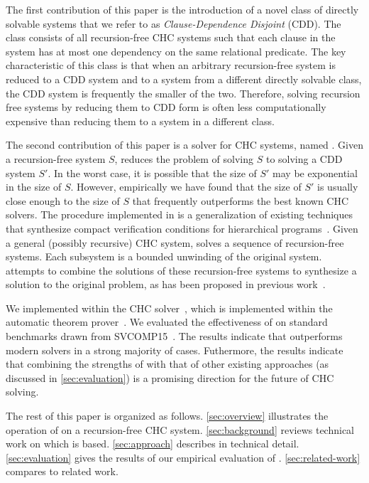 The first contribution of this paper is the introduction of a novel
class of directly solvable systems that we refer to as
\emph{Clause-Dependence Disjoint} (CDD).
%
The class consists of all recursion-free CHC systems such that each
clause in the system has at most one dependency on the same relational
predicate.
%
The key characteristic of this class is that when an arbitrary
recursion-free system is reduced to a CDD system and to a system from
a different directly solvable class, the CDD system is frequently the
smaller of the two.
%
Therefore, solving recursion free systems by reducing them to CDD form
is often less computationally expensive than reducing them to a
system in a different class.

The second contribution of this paper is a solver for CHC systems,
named \sys.
%
Given a recursion-free system $S$, \sys reduces the problem of solving
$S$ to solving a CDD system $S'$.
%
In the worst case, it is possible that the size of $S'$ may be
exponential in the size of $S$.
%
However, empirically we have found that the size of $S'$ is usually
close enough to the size of $S$ that \sys frequently outperforms the best
known CHC solvers.
%
The procedure implemented in \sys is a generalization of existing
techniques that synthesize compact verification conditions for
hierarchical programs~\cite{flanagan01,lal-qadeer15}.
%
Given a general (possibly recursive) CHC system, \sys solves a
sequence of recursion-free systems.
%
Each subsystem is a bounded unwinding of the original system. \sys
attempts to combine the solutions of these recursion-free systems to
synthesize a solution to the original problem, as has been proposed
in previous work~\cite{rummer13b}.

We implemented \sys within the \duality CHC solver~\cite{bjorner13},
which is implemented within the \zthree automatic theorem
prover~\cite{moura08}.
%
We evaluated the effectiveness of \sys on standard benchmarks drawn
from SVCOMP15~\cite{svcomp15}.
%
The results indicate that \sys outperforms modern solvers in a strong
majority of cases.
%
Futhermore, the results indicate that combining the strengths of \sys
with that of other existing approaches (as discussed in
\autoref{sec:evaluation}) is a promising direction for the future of
CHC solving.

The rest of this paper is organized as follows.
%
\autoref{sec:overview} illustrates the operation of \sys on a
recursion-free CHC system.
%
\autoref{sec:background} reviews technical work on which \sys is
based.
%
\autoref{sec:approach} describes \sys in technical detail.
%
\autoref{sec:evaluation} gives the results of our empirical evaluation
of \sys.
%
\autoref{sec:related-work} compares \sys to related work.
